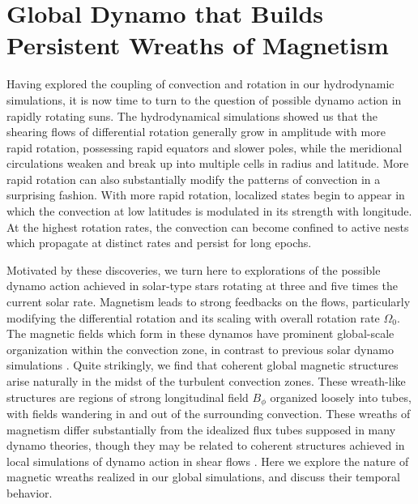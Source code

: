 %
%     
%
%


\chapter{Global Dynamo that Builds Persistent Wreaths of Magnetism}
\label{chapter:case D3}

Having explored the coupling of convection and rotation in our
hydrodynamic simulations, it is now time to turn to the question of
possible dynamo action in rapidly rotating suns.  The hydrodynamical
simulations showed us that the shearing flows of differential rotation
generally grow in amplitude with more rapid rotation, possessing rapid
equators and slower poles, while the meridional circulations weaken
and break up into multiple cells in radius and latitude.  More rapid
rotation can also substantially modify the patterns of convection in a
surprising fashion.  With more rapid rotation, localized states begin
to appear in which the convection at low latitudes is modulated in its
strength with longitude.  At the highest rotation rates, the
convection can become confined to active nests which propagate at
distinct rates and persist for long epochs.

Motivated by these discoveries, we turn here to explorations
of the possible dynamo action achieved in solar-type stars rotating at
three and five times the current solar rate.  
%
Magnetism leads to strong feedbacks on the flows,
particularly modifying the differential rotation and its scaling with
overall rotation rate $\Omega_0$.  The magnetic fields which form in these
dynamos have prominent global-scale organization within the convection zone, in contrast to
previous solar dynamo simulations \citep{Brun_et_al_2004, Browning_et_al_2006}.  
Quite strikingly, we find that
coherent global magnetic structures arise naturally in the midst of the
turbulent convection zones.  These wreath-like structures are regions of
strong longitudinal field $B_\phi$ organized loosely into tubes, with fields wandering in
and out of the surrounding convection.  These wreaths of magnetism differ
substantially from the idealized flux tubes supposed in many dynamo
theories, though they may be related to coherent structures
achieved in local simulations of dynamo action in shear flows
\citep{Cline_et_al_2003a, Vasil&Brummell_2008,Vasil&Brummell_2009}.  
Here we explore the nature of magnetic
wreaths realized in our global simulations, and discuss their
temporal behavior.

